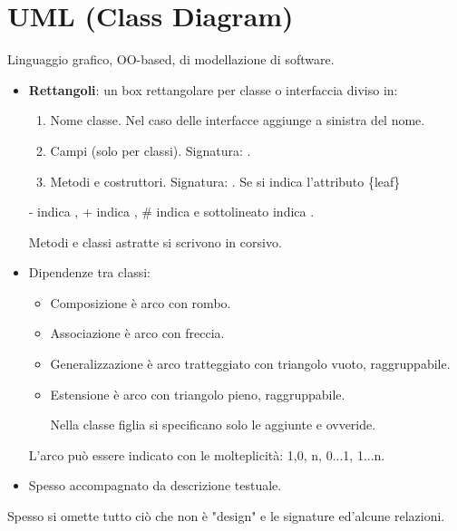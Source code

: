 \section{UML (Class Diagram)}
Linguaggio grafico, OO-based, di modellazione di software.
\begin{itemize}
	\item \textbf{Rettangoli}: un box rettangolare per classe o interfaccia diviso in:
	\begin{enumerate}
		\item Nome classe. Nel caso delle interfacce aggiunge  a sinistra del nome.
		\item Campi (solo per classi). Signatura: .
		\item Metodi e costruttori. Signatura: .
		Se  si indica l'attributo \{leaf\}
	\end{enumerate}
	- indica , + indica , \# indica  e sottolineato indica .

	Metodi e classi astratte si scrivono in corsivo.
	\item Dipendenze tra classi:
	\begin{itemize}
		\item Composizione è arco con rombo.
		\item Associazione è arco con freccia.
		\item Generalizzazione è arco tratteggiato con triangolo vuoto, raggruppabile.
		\item Estensione è arco con triangolo pieno, raggruppabile.

		Nella classe figlia si specificano solo le aggiunte e ovveride.
	\end{itemize}
	L'arco può essere indicato con le molteplicità: 1,0, n, 0...1, 1...n.

	\item Spesso accompagnato da descrizione testuale.
\end{itemize}

Spesso si omette tutto ciò che non è "design" e le signature ed'alcune relazioni.

